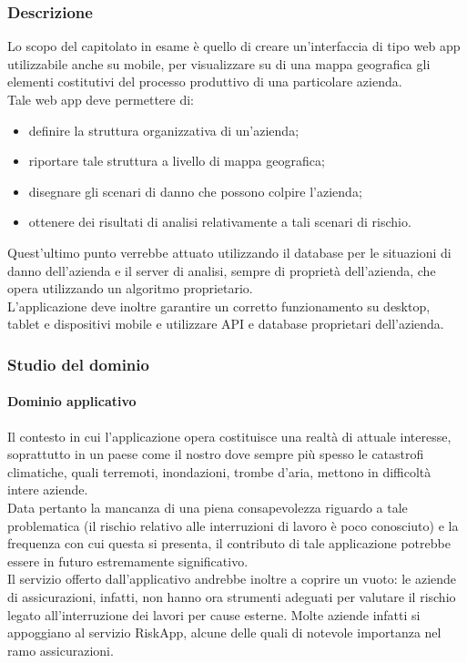 		\subsubsection{Descrizione}
		Lo scopo del capitolato in esame è quello di creare un'interfaccia di tipo web app utilizzabile anche su mobile, per visualizzare su di una 
		mappa geografica gli elementi costitutivi del processo produttivo di una particolare azienda.
		\\Tale web app deve permettere di:
		\begin{itemize}
			\item definire la struttura organizzativa di un'azienda;
			\item riportare tale struttura a livello di mappa geografica;
			\item disegnare gli scenari di danno che possono colpire l'azienda;
			\item ottenere dei risultati di analisi relativamente a tali scenari di rischio.
		\end{itemize}
		Quest'ultimo punto verrebbe attuato utilizzando il database per le situazioni di danno dell'azienda e il server di analisi, sempre di proprietà dell'azienda,
		che opera utilizzando un algoritmo proprietario.
		\\L'applicazione deve inoltre garantire un corretto funzionamento su desktop, tablet e dispositivi mobile e utilizzare API e database proprietari dell'azienda.
		\subsubsection{Studio del dominio}
			\paragraph{Dominio applicativo}
			Il contesto in cui l'applicazione opera costituisce una realtà di attuale interesse, soprattutto in un paese come il nostro dove sempre più spesso le catastrofi climatiche,
			quali terremoti, inondazioni, trombe d'aria, mettono in difficoltà intere aziende.
			\\Data pertanto la mancanza di una piena consapevolezza riguardo a tale problematica (il rischio relativo alle interruzioni di lavoro è poco conosciuto) 
			e la frequenza con cui questa si presenta, il contributo di tale applicazione potrebbe essere in futuro estremamente significativo.
			\\Il servizio offerto dall'applicativo andrebbe inoltre a coprire un vuoto: le aziende di assicurazioni, infatti, non hanno ora strumenti 
			adeguati per valutare il rischio legato all'interruzione dei lavori per cause esterne. Molte aziende infatti si appoggiano al servizio 
			RiskApp, alcune delle quali di notevole importanza nel ramo assicurazioni.
